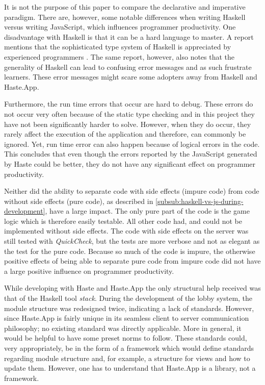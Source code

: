 \documentclass[a4paper]{article}
\begin{document}
It is not the purpose of this paper to compare the declarative and imperative paradigm. There are, however, some notable differences when writing Haskell versus writing JavaScript, which influences programmer productivity. One disadvantage with Haskell is that it can be a hard language to master. A report mentions that the sophisticated type system of Haskell is appreciated by experienced programmers \cite{heliumHaskell}. The same report, however, also notes that the generality of Haskell can lead to confusing error messages and as such frustrate learners. These error messages might scare some adopters away from Haskell and Haste.App.

Furthermore, the run time errors that occur are hard to debug. These errors do not occur very often because of the static type checking and in this project they have not been significantly harder to solve. However, when they do occur, they rarely affect the execution of the application and therefore, can commonly be ignored. Yet, run time error can also happen because of logical errors in the code. This concludes that even though the errors reported by the JavaScript generated by Haste could be better, they do not have any significant effect on programmer productivity.

Neither did the ability to separate code with side effects (impure code) from code without side effects (pure code), as described in \cref{subsub:haskell-vs-js-during-development}, have a large impact. The only pure part of the code is the game logic which is therefore easily testable. All other code had, and could not be implemented without side effects. The code with side effects on the server was still tested with \textit{QuickCheck}, but the tests are more verbose and not as elegant as the test for the pure code. Because so much of the code is impure, the otherwise positive effects of being able to separate pure code from impure code did not have a large positive influence on programmer productivity.

While developing with Haste and Haste.App the only structural help received was that of the Haskell tool \textit{stack}. During the development of the lobby system, the module structure was redesigned twice, indicating a lack of standards. However, since Haste.App is fairly unique in its seamless client to server communication philosophy; no existing standard was directly applicable. More in general, it would be helpful to have some preset norms to follow. These standards could, very appropriately, be in the form of a framework which would define standards regarding module structure and, for example, a structure for views and how to update them. However, one has to understand that Haste.App is a library, not a framework.
\end{document}
